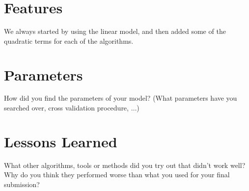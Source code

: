 \documentclass[a4paper, 11pt]{article}
\begin{document}
\section{Features}
We always started by using the linear model, and then added some of the quadratic terms for each of the algorithms.

\section{Parameters}
How did you find the parameters of your model? (What parameters have you searched over, cross validation procedure, $\ldots$)

\section{Lessons Learned} What other algorithms, tools or methods did you try out that didn't work well?
Why do you think they performed worse than what you used for your final submission?
\end{document}
